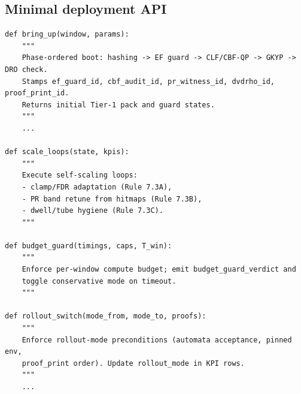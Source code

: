 \subsection{Minimal deployment API}\label{subsec:deploy-api}
\emph{}
\begin{lstlisting}
def bring_up(window, params):
    """
    Phase-ordered boot: hashing -> EF guard -> CLF/CBF-QP -> GKYP -> DRO check.
    Stamps ef_guard_id, cbf_audit_id, pr_witness_id, dvdrho_id, proof_print_id.
    Returns initial Tier-1 pack and guard states.
    """
    ...

def scale_loops(state, kpis):
    """
    Execute self-scaling loops:
    - clamp/FDR adaptation (Rule 7.3A),
    - PR band retune from hitmaps (Rule 7.3B),
    - dwell/tube hygiene (Rule 7.3C).
    """

def budget_guard(timings, caps, T_win):
    """
    Enforce per-window compute budget; emit budget_guard_verdict and
    toggle conservative mode on timeout.
    """

def rollout_switch(mode_from, mode_to, proofs):
    """
    Enforce rollout-mode preconditions (automata acceptance, pinned env,
    proof_print order). Update rollout_mode in KPI rows.
    """
    ...
\end{lstlisting}
